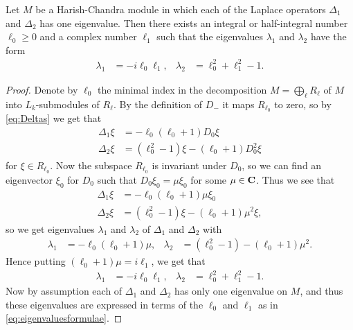 \begin{proposition}
  Let $M$ be a Harish-Chandra module in which each of the Laplace operators $\Delta_1$ and $\Delta_2$ has one eigenvalue. Then there exists an integral or half-integral number $\ell_0\geq 0$ and a complex number $\ell_1$ such that the eigenvalues $\lambda_1$ and $\lambda_2$ have the form
  \begin{align}\label{eq:eigenvaluesformulae}
    \lambda_1 &= -i\ell_0\ell_1, & \lambda_2 &= \ell_0^2 + \ell_1^2 - 1.
  \end{align}
\end{proposition}
\begin{proof}
  Denote by $\ell_0$ the minimal index in the decomposition $M=\bigoplus_\ell R_\ell$ of $M$ into $L_k$-submodules of $R_\ell$. By the definition of $D_-$ it maps $R_{\ell_0}$ to zero, so by \cref{eq:Deltas} we get that
  \begin{align*}
    \Delta_1 \xi &= -\ell_0(\ell_0+1)D_0\xi \\
    \Delta_2 \xi &= (\ell_0^2-1)\xi - (\ell_0+1)D_0^2\xi
  \end{align*}
  for $\xi\in R_{\ell_0}$. Now the subspace $R_{\ell_0}$ is invariant under $D_0$, so we can find an eigenvector $\xi_0$ for $D_0$ such that $D_0\xi_0 = \mu\xi_0$ for some $\mu\in\mathbf{C}$. Thus we see that
  \begin{align*}
    \Delta_1 \xi &= -\ell_0(\ell_0+1)\mu\xi_0 \\
    \Delta_2 \xi &= (\ell_0^2-1)\xi - (\ell_0+1)\mu^2\xi,
  \end{align*}
  so we get eigenvalues $\lambda_1$ and $\lambda_2$ of $\Delta_1$ and $\Delta_2$ with
  \begin{align*}
    \lambda_1 &= -\ell_0(\ell_0+1)\mu, & \lambda_2 &= (\ell_0^2-1) - (\ell_0+1)\mu^2.
  \end{align*}
  Hence putting $(\ell_0+1)\mu = i\ell_1$, we get that
  \begin{align*}
    \lambda_1 &= -i\ell_0\ell_1, & \lambda_2 &= \ell_0^2 + \ell_1^2 - 1.
  \end{align*}
  Now by assumption each of $\Delta_1$ and $\Delta_2$ has only one eigenvalue on $M$, and thus these eigenvalues are expressed in terms of the $\ell_0$ and $\ell_1$ as in \cref{eq:eigenvaluesformulae}. 
\end{proof}

